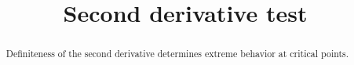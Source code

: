 \documentclass{ximera}
\title{Second derivative test}
\begin{document}
	\begin{abstract}
		Definiteness of the second derivative determines extreme behavior at critical points.
	\end{abstract}
\end{document}
